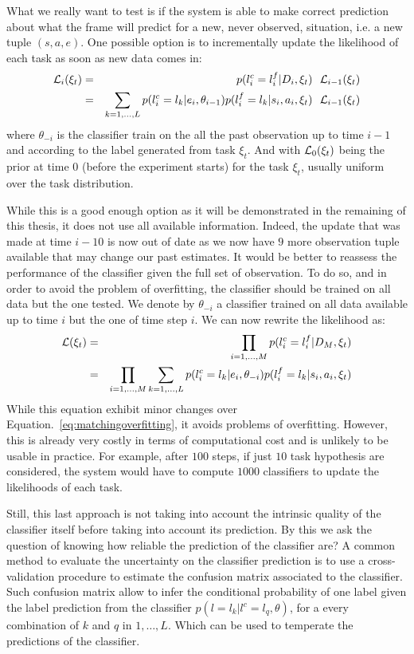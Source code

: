 What we really want to test is if the system is able to make correct prediction about what the frame will predict for a new, never observed, situation, i.e. a new tuple $(s,a,e)$. One possible option is to incrementally update the likelihood of each task as soon as new data comes in:
%
\begin{eqnarray}
\mathcal{L}_i(\xi_t) &=& p(l^c_i = l^f_i | D_i, \xi_t) ~~ \mathcal{L}_{i-1}(\xi_t) \nonumber \\ 
&=& \sum_{k = 1, \ldots, L} p(l^c_i = l_k | e_i, \theta_{i-1}) p(l^f_i = l_k | s_i, a_i, \xi_t) ~~ \mathcal{L}_{i-1}(\xi_t) 
\label{eq:matchingfilter} 
\end{eqnarray}
%
where $\theta_{-i}$ is the classifier train on the all the past observation up to time $i-1$and according to the label generated from task $\xi_t$. And with $\mathcal{L}_{0}(\xi_t)$ being the prior at time 0 (before the experiment starts) for the task $\xi_t$, usually uniform over the task distribution.

While this is a good enough option as it will be demonstrated in the remaining of this thesis, it does not use all available information. Indeed, the update that was made at time $i-10$ is now out of date as we now have $9$ more observation tuple available that may change our past estimates. It would be better to reassess the performance of the classifier given the full set of observation. To do so, and in order to avoid the problem of overfitting, the classifier should be trained on all data but the one tested. We denote by $\theta_{-i}$ a classifier trained on all data available up to time $i$ but the one of time step $i$. We can now rewrite the likelihood as:
%
\begin{eqnarray}
\mathcal{L}(\xi_t) &=& \prod_{i = 1,\ldots,M} p(l^c_i = l^f_i | D_M, \xi_t) \nonumber \\ 
&=& \prod_{i = 1,\ldots,M} \sum_{k = 1, \ldots, L} p(l^c_i = l_k | e_i, \theta_{-i}) p(l^f_i = l_k | s_i, a_i, \xi_t) 
\label{eq:matching} 
\end{eqnarray}
%
While this equation exhibit minor changes over Equation.~\ref{eq:matchingoverfitting}, it avoids problems of overfitting. However, this is already very costly in terms of computational cost and is unlikely to be usable in practice. For example, after $100$ steps, if just $10$ task hypothesis are considered, the system would have to compute $1000$ classifiers to update the likelihoods of each task.

Still, this last approach is not taking into account the intrinsic quality of the classifier itself before taking into account its prediction. By this we ask the question of knowing how reliable the prediction of the classifier are? A common method to evaluate the uncertainty on the classifier prediction is to use a cross-validation procedure  to estimate the confusion matrix associated to the classifier. Such confusion matrix allow to infer the conditional probability of one label given the label prediction from the classifier $p(l = l_k| l^c = l_q, \theta)$, for a every combination of $k$ and $q$ in $1, \ldots, L$. Which can be used to temperate the predictions of the classifier. 

